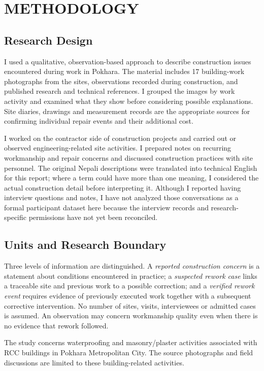 \chapter{METHODOLOGY}
\section{Research Design}
I used a qualitative, observation-based approach to describe construction issues encountered during work in Pokhara. The material includes 17 building-work photographs from the sites, observations recorded during construction, and published research and technical references. I grouped the images by work activity and examined what they show before considering possible explanations. Site diaries, drawings and measurement records are the appropriate sources for confirming individual repair events and their additional cost.

I worked on the contractor side of construction projects and carried out or observed engineering-related site activities. I prepared notes on recurring workmanship and repair concerns and discussed construction practices with site personnel. The original Nepali descriptions were translated into technical English for this report; where a term could have more than one meaning, I considered the actual construction detail before interpreting it. Although I reported having interview questions and notes, I have not analyzed those conversations as a formal participant dataset here because the interview records and research-specific permissions have not yet been reconciled.

\section{Units and Research Boundary}
Three levels of information are distinguished. A \emph{reported construction concern} is a statement about conditions encountered in practice; a \emph{suspected rework case} links a traceable site and previous work to a possible correction; and a \emph{verified rework event} requires evidence of previously executed work together with a subsequent corrective intervention. No number of sites, visits, interviewees or admitted cases is assumed. An observation may concern workmanship quality even when there is no evidence that rework followed.

The study concerns waterproofing and masonry/plaster activities associated with RCC buildings in Pokhara Metropolitan City. The source photographs and field discussions are limited to these building-related activities.

